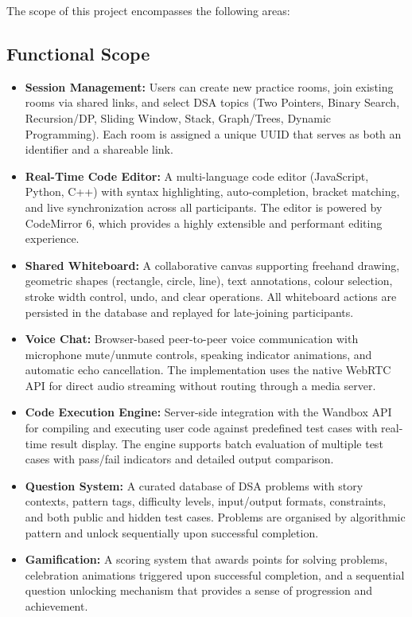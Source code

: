 The scope of this project encompasses the following areas:

\subsection{Functional Scope}

\begin{itemize}
    \item \textbf{Session Management:} Users can create new practice rooms, join existing rooms via shared links, and select DSA topics (Two Pointers, Binary Search, Recursion/DP, Sliding Window, Stack, Graph/Trees, Dynamic Programming). Each room is assigned a unique UUID that serves as both an identifier and a shareable link.
    \item \textbf{Real-Time Code Editor:} A multi-language code editor (JavaScript, Python, C++) with syntax highlighting, auto-completion, bracket matching, and live synchronization across all participants. The editor is powered by CodeMirror 6, which provides a highly extensible and performant editing experience.
    \item \textbf{Shared Whiteboard:} A collaborative canvas supporting freehand drawing, geometric shapes (rectangle, circle, line), text annotations, colour selection, stroke width control, undo, and clear operations. All whiteboard actions are persisted in the database and replayed for late-joining participants.
    \item \textbf{Voice Chat:} Browser-based peer-to-peer voice communication with microphone mute/unmute controls, speaking indicator animations, and automatic echo cancellation. The implementation uses the native WebRTC API for direct audio streaming without routing through a media server.
    \item \textbf{Code Execution Engine:} Server-side integration with the Wandbox API for compiling and executing user code against predefined test cases with real-time result display. The engine supports batch evaluation of multiple test cases with pass/fail indicators and detailed output comparison.
    \item \textbf{Question System:} A curated database of DSA problems with story contexts, pattern tags, difficulty levels, input/output formats, constraints, and both public and hidden test cases. Problems are organised by algorithmic pattern and unlock sequentially upon successful completion.
    \item \textbf{Gamification:} A scoring system that awards points for solving problems, celebration animations triggered upon successful completion, and a sequential question unlocking mechanism that provides a sense of progression and achievement.
\end{itemize}

